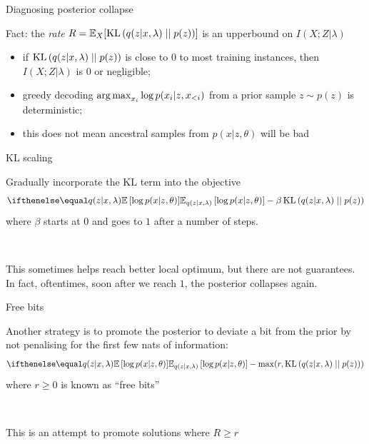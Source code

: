 \begin{frame}{Diagnosing posterior collapse}

Fact: the \emph{rate} $R = \mathbb E_X[\operatorname{KL}\left(q(z|x, \lambda)\mid\mid p(z)\right)]$ is an upperbound on $I(X; Z|\lambda)$  \pause

\begin{itemize}
	\item if $\operatorname{KL}\left(q(z|x, \lambda)\mid\mid p(z)\right)$ is close to $0$ to most training instances, then $I(X; Z|\lambda)$ is $0$ or negligible; \pause
	\item greedy decoding $\operatorname*{arg\,max}_{x_i} \log p(x_i|z, x_{<i})$ from a prior sample $z \sim p(z)$ is deterministic; \pause
	\item this does not mean ancestral samples from $p(x|z, \theta)$ will be bad
\end{itemize}


\end{frame}

\begin{frame}{KL scaling}


Gradually incorporate the KL term into the objective
\begin{equation*}
\E[q(z|x,\lambda)]{\log p(x|z,\theta)} - \beta \KL{q(z|x,\lambda)}{p(z)}
\end{equation*}
where $\beta$ starts at $0$ and goes to $1$ after a number of steps.

~ \pause

This sometimes helps reach better local optimum, but there are not guarantees. In fact, oftentimes, soon after we reach $1$, the posterior collapses again.
\end{frame}

\begin{frame}{Free bits}

Another strategy is to promote the posterior to deviate a bit from the prior by not penalising for the first few nats of information:
\begin{equation*}
\E[q(z|x,\lambda)]{\log p(x|z,\theta)} - \max(r, \KL{q(z|x,\lambda)}{p(z)})
\end{equation*}
where $r \ge 0$ is known as ``free bits''  

~

This is an attempt to promote solutions where $R \ge r$

\end{frame}

